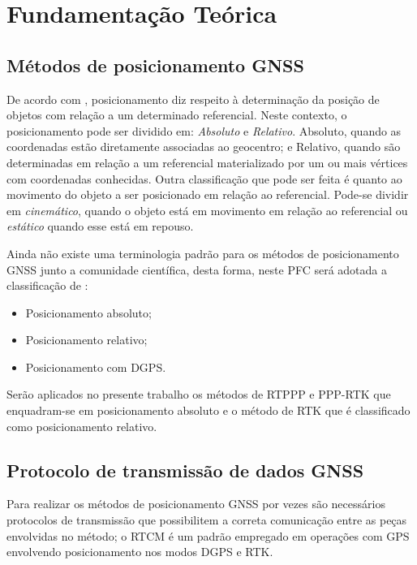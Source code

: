 \chapter{Fundamentação Teórica}
\label{chap:fundament}

\section{Métodos de posicionamento GNSS}
\noindent

De acordo com \cite{monico2008}, posicionamento diz respeito à determinação da posição de objetos com relação a um determinado referencial. Neste contexto, o posicionamento pode ser dividido em: \textit{Absoluto} e \textit{Relativo}. Absoluto, quando as coordenadas estão diretamente associadas ao geocentro; e Relativo, quando são determinadas em relação a um referencial materializado por um ou mais vértices com coordenadas conhecidas. Outra classificação que pode ser feita é quanto ao movimento do objeto a ser posicionado em relação ao referencial. Pode-se dividir em \textit{cinemático}, quando o objeto está em movimento em relação ao referencial ou \textit{estático} quando esse está em repouso.

Ainda não existe uma terminologia padrão para os métodos de posicionamento GNSS junto a comunidade científica, desta forma, neste PFC será adotada a classificação de \cite{monico2008}:
\begin{itemize}
    \item Posicionamento absoluto;
    \item Posicionamento relativo;
    \item Posicionamento com DGPS.
\end{itemize}

Serão aplicados no presente trabalho os métodos de RTPPP e PPP-RTK que enquadram-se em posicionamento absoluto e o método de RTK que é classificado como posicionamento relativo.

\section{Protocolo de transmissão de dados GNSS}
\noindent

Para realizar os métodos de posicionamento GNSS por vezes são necessários protocolos de transmissão que possibilitem a correta comunicação entre as peças envolvidas no método; o RTCM é um padrão empregado em operações com GPS envolvendo posicionamento nos modos DGPS e RTK.

